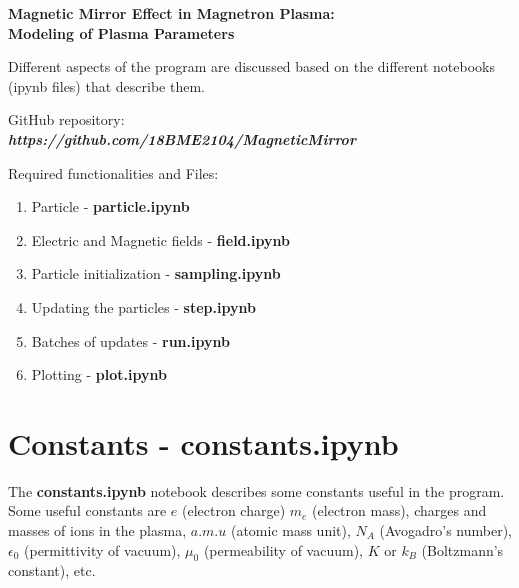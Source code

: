 \documentclass[12pt]{article}
\begin{document}
	
	{\selectfont 
		\begin{center}
			\Large{\textbf{Magnetic Mirror Effect in Magnetron Plasma:}} \\
			\Large{\textbf{Modeling of Plasma Parameters}} \\
		\end{center}
		
		Different aspects of the program are discussed based on the different notebooks (ipynb files) that describe them.
		
		\begin{center}
			\begin{tcolorbox}[width=15cm]
				GitHub repository:
				\vspace{0.2cm} 
			\phantom{a} \\
		\phantom{push this repository}
	\textbf{\textit{https://github.com/18BME2104/MagneticMirror}} \\
\phantom{a}
			\end{tcolorbox}
		\end{center}
		
		\begin{center}
			\begin{tcolorbox}[width=12cm]
				Required functionalities and Files:
				\vspace{0.2cm} 
				\begin{enumerate}
					\item Particle - \textbf{particle.ipynb}
					\item Electric and Magnetic fields - \textbf{field.ipynb}
					\item Particle initialization - \textbf{sampling.ipynb}
					\item Updating the particles - \textbf{step.ipynb}
					\item Batches of updates - \textbf{run.ipynb}
					\item Plotting - \textbf{plot.ipynb}
				\end{enumerate}
			\end{tcolorbox}
		\end{center}
	
		\section{Constants - constants.ipynb}
		The \textbf{constants.ipynb} notebook describes some constants useful in the program. Some useful constants are $e$ (electron charge) $m_{e}$ (electron mass), charges and masses of ions in the plasma, $a.m.u$ (atomic mass unit), $N_{A}$ (Avogadro's number), $\epsilon_{0}$ (permittivity of vacuum), $\mu_{0}$ (permeability of vacuum), $K$ or $k_{B}$ (Boltzmann's constant), etc.
		
}
\end{document}

